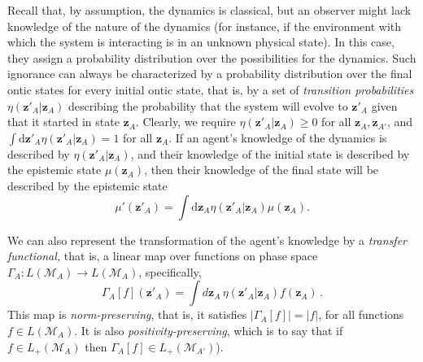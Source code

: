 \documentclass[pra,superscriptaddress,nofootinbib,12pt]{revtex4-2}
\begin{document}
Recall that, by assumption, the dynamics is classical, but an observer might lack knowledge of the nature of the dynamics (for instance, if the environment with which the system is interacting is in an unknown physical state).  In this case, they assign a probability distribution over the possibilities for the dynamics. Such ignorance can always be characterized by a probability distribution over the final ontic states for every initial ontic state, that is, by a set of \emph{transition probabilities} $\eta(\mathbf{z}'_{A}|\mathbf{z}_A)$ describing the probability that the system will evolve to $\mathbf{z}'_{A}$ given that it started in state $\mathbf{z}_A$.  Clearly, we require $\eta(\mathbf{z}'_{A}|\mathbf{z}_A)\ge 0$ for all $\mathbf{z}_{A},\mathbf{z}_{A'}$, and $\int \textrm{d}\mathbf{z}'_{A} \eta(\mathbf{z}'_{A}|\mathbf{z}_A) =1$ for all $\mathbf{z}_{A}$.  If an agent's knowledge of the dynamics is described by $\eta(\mathbf{z}'_{A}|\mathbf{z}_A)$, and their knowledge of the initial state is described by the epistemic state $\mu(\mathbf{z}_A)$, then their knowledge of the final state will be described by the epistemic state
\begin{equation}
\mu'(\mathbf{z}'_{A})=\int \textrm{d}\mathbf{z}_{A} \eta(\mathbf{z}'_{A}|\mathbf{z}_A) \mu(\mathbf{z}_A).
\end{equation}

We can also represent the transformation of the agent's knowledge by a \emph{transfer functional,} that is, a linear map over functions on phase space $\Gamma_{A} :L(\mathcal{M}_A)\rightarrow L(\mathcal{M}_{A})$, specifically,
\begin{equation}
  \Gamma_{A} [f](\mathbf{z}'_{A})=\int d\mathbf{z}_A\, \eta(\mathbf{z}'_{A}|\mathbf{z}_A)f(\mathbf{z}_A)\,.
\end{equation}
This map is \emph{norm-preserving}, that is, it satisfies $|\Gamma_{A} [f]|=|f|$, for all functions $f \in L(\mathcal{M}_A)$.  It is also \emph{positivity-preserving}, which is to say that if $f \in L_+(\mathcal{M}_A)$ then $\Gamma_{A} [f] \in L_+(\mathcal{M}_{A'})$).
\end{document}
